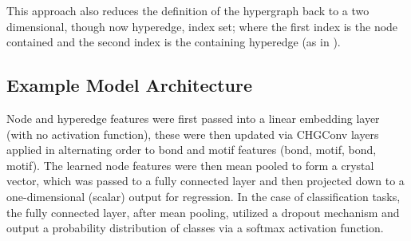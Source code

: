 \documentclass[10pt,a4paper]{article}
\begin{document}
This approach also reduces the definition of the hypergraph back to a two dimensional, though now hyperedge, index set; where the first index is the node contained and the second index is the containing hyperedge (as in \cite{hypergraphconv}).




\subsection{Example Model Architecture}
Node and hyperedge features were first passed into a linear embedding layer (with no activation function), these were then updated via CHGConv layers applied in alternating order to bond and motif features (bond, motif, bond, motif). The learned node features were then mean pooled to form a crystal vector, which was passed to a fully connected layer and then projected down to a one-dimensional (scalar) output for regression. In the case of classification tasks, the fully connected layer, after mean pooling, utilized a dropout mechanism and output a probability distribution of classes via a softmax activation function.
\end{document}
